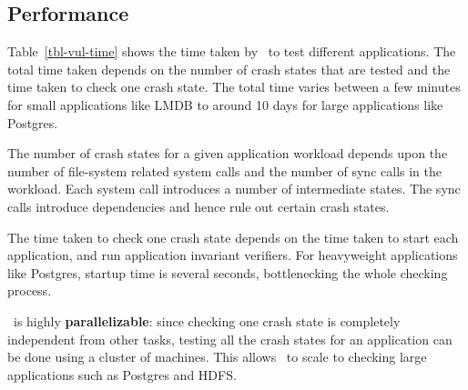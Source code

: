 \subsection{Performance}
\label{sec-runningtime}



Table~\ref{tbl-vul-time} shows the time taken by \toolname\ to test different
applications. The total time taken depends on the number of crash states that
are tested and the time taken to check one crash state. The total time varies
between a few minutes for small applications like LMDB to around 10 days for
large applications like Postgres.

The number of crash states for a given application workload depends upon the
number of file-system related system calls and the number of sync calls in the
workload. Each system call introduces a number of intermediate states. The sync
calls introduce dependencies and hence rule out certain crash states.

The time taken to check one crash state depends on the time taken to start each
application, and run application invariant verifiers. For heavyweight
applications like Postgres, startup time is several seconds, bottlenecking
the whole checking process.

\toolname\ is highly \textbf{parallelizable}: since checking one crash state is
completely independent from other tasks, testing all the crash states for an
application can be done using a cluster of machines. This allows \toolname\ to
scale to checking large applications such as Postgres and HDFS.








